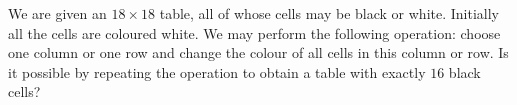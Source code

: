 We are given an $18\times 18$ table, all of whose cells may be black or white. Initially all the cells are coloured white. We may perform the following operation: choose one column or one row and change the colour of all cells in this column or row. Is it possible by repeating the operation to obtain a table with exactly $16$ black cells?